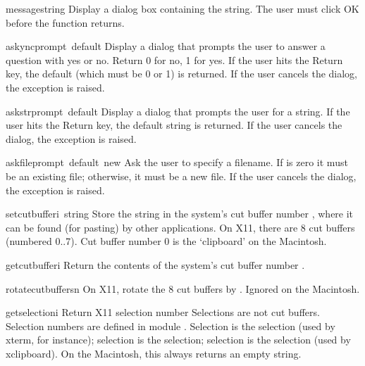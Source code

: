 \begin{funcdesc}{message}{string}
Display a dialog box containing the string.
The user must click OK before the function returns.
\end{funcdesc}

\begin{funcdesc}{askync}{prompt\, default}
Display a dialog that prompts the user to answer a question with yes or
no.
Return 0 for no, 1 for yes.
If the user hits the Return key, the default (which must be 0 or 1) is
returned.
If the user cancels the dialog, the
exception is raised.
\end{funcdesc}

\begin{funcdesc}{askstr}{prompt\, default}
Display a dialog that prompts the user for a string.
If the user hits the Return key, the default string is returned.
If the user cancels the dialog, the
exception is raised.
\end{funcdesc}

\begin{funcdesc}{askfile}{prompt\, default\, new}
Ask the user to specify a filename.
If
is zero it must be an existing file; otherwise, it must be a new file.
If the user cancels the dialog, the
exception is raised.
\end{funcdesc}

\begin{funcdesc}{setcutbuffer}{i\, string}
Store the string in the system's cut buffer number
,
where it can be found (for pasting) by other applications.
On X11, there are 8 cut buffers (numbered 0..7).
Cut buffer number 0 is the `clipboard' on the Macintosh.
\end{funcdesc}

\begin{funcdesc}{getcutbuffer}{i}
Return the contents of the system's cut buffer number
.
\end{funcdesc}

\begin{funcdesc}{rotatecutbuffers}{n}
On X11, rotate the 8 cut buffers by
.
Ignored on the Macintosh.
\end{funcdesc}

\begin{funcdesc}{getselection}{i}
Return X11 selection number
Selections are not cut buffers.
Selection numbers are defined in module
.
Selection  is the
selection (used by
xterm,
for instance);
selection  is the
selection; selection  is the
selection (used by
xclipboard).
On the Macintosh, this always returns an empty string.
\end{funcdesc}

